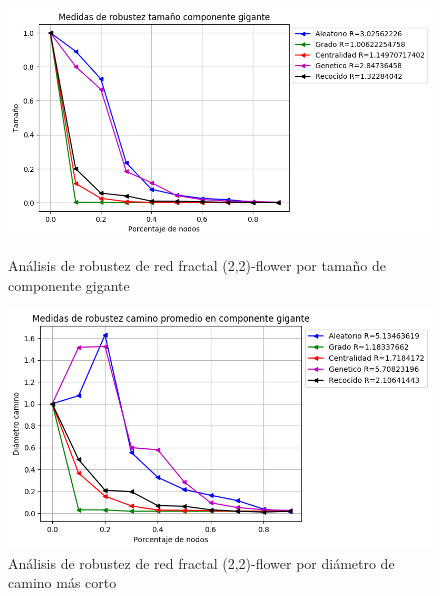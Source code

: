 \begin{figure}[!htb]
    \begin{minipage}{0.48\textwidth}
        \centering
        \includegraphics[scale=0.4]{CapituloAAnexos/imagenesAnexoC/Robustez/grafica_GC20180505_044516floweru2v2}
        \caption{Análisis de robustez de red fractal (2,2)-flower por tamaño de componente gigante}
    \end{minipage}\hfill
   \begin{minipage}{0.48\textwidth}
         \centering
       \includegraphics[scale=0.4]{CapituloAAnexos/imagenesAnexoC/Robustez/grafica_APL20180505_044516floweru2v2}
        \caption{Análisis de robustez de red fractal (2,2)-flower por diámetro de camino más corto}
    \end{minipage}
\end{figure}


